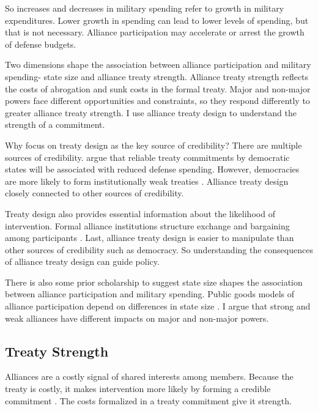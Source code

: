 \documentclass[12pt]{article}
\begin{document}
So increases and decreases in military spending refer to growth in military expenditures. 
Lower growth in spending can lead to lower levels of spending, but that is not necessary. 
Alliance participation may accelerate or arrest the growth of defense budgets. 


Two dimensions shape the association between alliance participation and military spending- state size and alliance treaty strength. 
Alliance treaty strength reflects the costs of abrogation and sunk costs in the formal treaty. 
Major and non-major powers face different opportunities and constraints, so they respond differently to greater alliance treaty strength. 
I use alliance treaty design to understand the strength of a commitment.


Why focus on treaty design as the key source of credibility? 
There are multiple sources of credibility. 
\citet{DigiuseppePoast2016} argue that reliable treaty commitments by democratic states will be associated with reduced defense spending. 
However, democracies are more likely to form institutionally weak treaties \citep{Mattes2012}. 
Alliance treaty design closely connected to other sources of credibility. 


Treaty design also provides essential information about the likelihood of intervention. 
Formal alliance institutions structure exchange and bargaining among participants \citep{Williamson1985, North1990, DiermeierKrehbiel2003}.
Last, alliance treaty design is easier to manipulate than other sources of credibility such as democracy. 
So understanding the consequences of alliance treaty design can guide policy. 


There is also some prior scholarship to suggest state size shapes the association between alliance participation and military spending. 
Public goods models of alliance participation depend on differences in state size \citep{OlsonZeckhauser1966, DudleyMontmarquette1981}.  
I argue that strong and weak alliances have different impacts on major and non-major powers.


\subsection{Treaty Strength} 

Alliances are a costly signal of shared interests among members.
Because the treaty is costly, it makes intervention more likely by forming a credible commitment \citep{Fearon1997, Morrow2000}. 
The costs formalized in a treaty commitment give it strength. 
\end{document}

